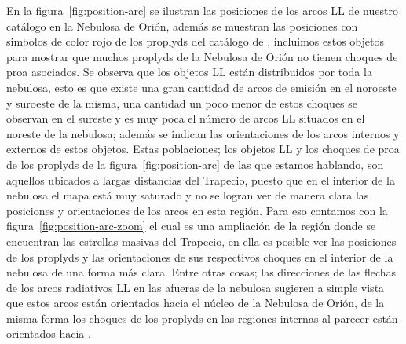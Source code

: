 En la figura~\ref{fig:position-arc} se ilustran las posiciones de los arcos LL de nuestro catálogo en la Nebulosa de Orión, además se muestran las posiciones con simbolos de color rojo de los proplyds del catálogo de \citet{Ricci:2008}, incluimos estos objetos para mostrar que muchos proplyds de la Nebulosa de Orión no tienen choques de proa asociados. Se observa que los objetos LL están distribuidos por toda la nebulosa, esto es que existe una gran cantidad de arcos de emisión en el noroeste y suroeste de la misma, una cantidad un poco menor de estos choques se observan en el sureste y es muy poca el número de arcos LL situados en el noreste de la nebulosa; además se indican las orientaciones de los arcos internos y externos de estos objetos. Estas poblaciones; los objetos LL y los choques de proa de los proplyds de la figura~\ref{fig:position-arc} de las que estamos hablando, son aquellos ubicados a largas distancias del Trapecio, puesto que en el interior de la nebulosa el mapa está muy saturado y no se logran ver de manera clara las posiciones y orientaciones de los arcos en esta región. Para eso contamos con la figura~\ref{fig:position-arc-zoom} el cual es una ampliación de la región donde se encuentran las estrellas masivas del Trapecio, en ella es posible ver las posiciones de los proplyds y las orientaciones de sus respectivos choques en el interior de la nebulosa de una forma más clara. Entre otras cosas; las direcciones de las flechas de los arcos radiativos LL en las afueras de la nebulosa sugieren a simple vista que estos arcos están orientados hacia el núcleo de la Nebulosa de Orión, de la misma forma los choques de los proplyds en las regiones internas al parecer están orientados hacia \thC{}.\\

